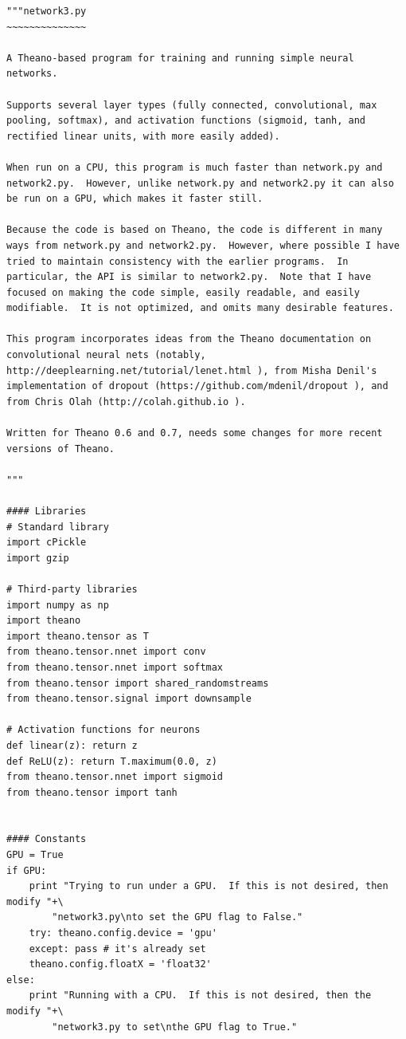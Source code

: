 \documentclass[a4paper,twoside,10pt]{book}
\begin{document}
\begin{lstlisting}
"""network3.py
~~~~~~~~~~~~~~

A Theano-based program for training and running simple neural
networks.

Supports several layer types (fully connected, convolutional, max
pooling, softmax), and activation functions (sigmoid, tanh, and
rectified linear units, with more easily added).

When run on a CPU, this program is much faster than network.py and
network2.py.  However, unlike network.py and network2.py it can also
be run on a GPU, which makes it faster still.

Because the code is based on Theano, the code is different in many
ways from network.py and network2.py.  However, where possible I have
tried to maintain consistency with the earlier programs.  In
particular, the API is similar to network2.py.  Note that I have
focused on making the code simple, easily readable, and easily
modifiable.  It is not optimized, and omits many desirable features.

This program incorporates ideas from the Theano documentation on
convolutional neural nets (notably,
http://deeplearning.net/tutorial/lenet.html ), from Misha Denil's
implementation of dropout (https://github.com/mdenil/dropout ), and
from Chris Olah (http://colah.github.io ).

Written for Theano 0.6 and 0.7, needs some changes for more recent
versions of Theano.

"""

#### Libraries
# Standard library
import cPickle
import gzip

# Third-party libraries
import numpy as np
import theano
import theano.tensor as T
from theano.tensor.nnet import conv
from theano.tensor.nnet import softmax
from theano.tensor import shared_randomstreams
from theano.tensor.signal import downsample

# Activation functions for neurons
def linear(z): return z
def ReLU(z): return T.maximum(0.0, z)
from theano.tensor.nnet import sigmoid
from theano.tensor import tanh


#### Constants
GPU = True
if GPU:
    print "Trying to run under a GPU.  If this is not desired, then modify "+\
        "network3.py\nto set the GPU flag to False."
    try: theano.config.device = 'gpu'
    except: pass # it's already set
    theano.config.floatX = 'float32'
else:
    print "Running with a CPU.  If this is not desired, then the modify "+\
        "network3.py to set\nthe GPU flag to True."


\end{lstlisting}
\end{document}
